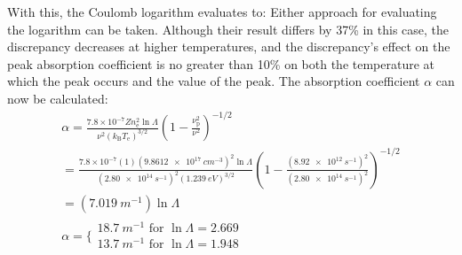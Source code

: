             With this, the Coulomb logarithm evaluates to:
            Either approach for evaluating the logarithm can be taken. Although their result differs by 37\% in this case, the discrepancy decreases at higher temperatures, and the discrepancy's effect on the peak absorption coefficient is no greater than 10\% on both the temperature at which the peak occurs and the value of the peak. The absorption coefficient $\alpha$ can now be calculated:
            \begin{multline*}
                \alpha = \frac{7.8\times 10^{-7}Zn_\mathrm{e}^2\ln{\Lambda}}{\nu^2(k_\mathrm{B}T_\mathrm{e})^{3/2}} \left(1-\frac{\nu_\mathrm{p}^2}{\nu^2}\right)^{-1/2} \\
                = \frac{7.8\times 10^{-7}(1)(\qty{9.8612e17}{cm^{-3}})^2\ln{\Lambda}}{(\qty{2.80e14}{s^{-1}})^2(\qty{1.239}{eV})^{3/2}} \left(1-\frac{(\qty{8.92e12}{s^{-1}})^2}{(\qty{2.80e14}{s^{-1}})^2}\right)^{-1/2} \\
                = (\qty{7.019}{m^{-1}})\ln{\Lambda}\\
                \alpha = \biggl\{ \begin{array}{l}
                    \qty{18.7}{m^{-1}}\text{ for }\ln{\Lambda} = 2.669 \\
                    \qty{13.7}{m^{-1}}\text{ for }\ln{\Lambda} = 1.948 \\
                \end{array}
            \end{multline*}
